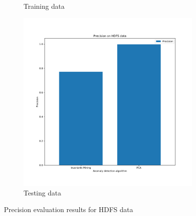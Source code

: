\documentclass[12pt,a4paper]{article}
\begin{document}
\begin{figure}[H]
\begin{subfigure}[H]{0.45\textwidth}
			\vspace{-0.3cm}
			\caption{Training data}
		\end{subfigure}
		\hfill
		\begin{subfigure}[H]{0.45\textwidth}
			\centering
			\includegraphics[width=1.3\textwidth]{Figures/Precision_2_test}
			
			\vspace{-0.3cm}
			\caption{Testing data}
		\end{subfigure}
		\vspace{-0.1cm}
		\caption{Precision evaluation results for HDFS data}
	\end{figure}
\end{document}
